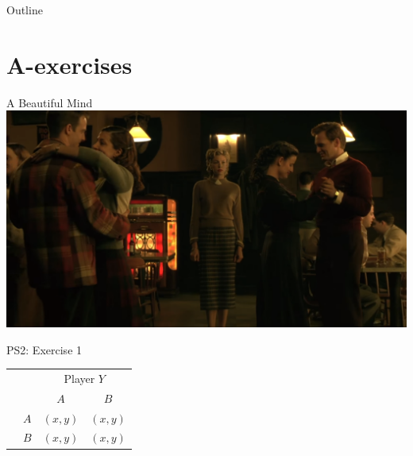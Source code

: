 

\maketitle

\begin{frame}{Outline}
\tableofcontents
\end{frame}


\section{A-exercises}

\begin{frame}{A Beautiful Mind}
 \includegraphics[width=1.0 \textwidth]{graphics/blonde}
\end{frame}


\begin{frame}{PS2: Exercise 1}
  \begin{table}
    \begin{tabular}{cc|c|c|}
        & \multicolumn{1}{c}{} & \multicolumn{2}{c}{Player $Y$}\\
        \parbox[t]{1mm}{}
        &  &   &  \\
        & $A$ & $(x,y)$ & $(x,y)$ \\
        & $B$ & $(x,y)$ & $(x,y)$ \\
    \end{tabular}
  \end{table}
\end{frame}


